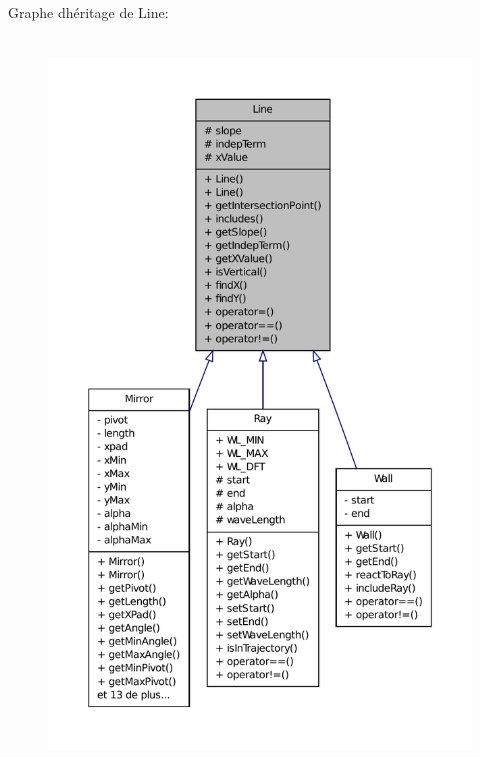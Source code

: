Graphe d\textquotesingle{}héritage de Line\+:\nopagebreak
\begin{figure}[H]
\begin{center}
\leavevmode
\includegraphics[height=550pt]{d4/d12/classLine__inherit__graph}
\end{center}
\end{figure}


